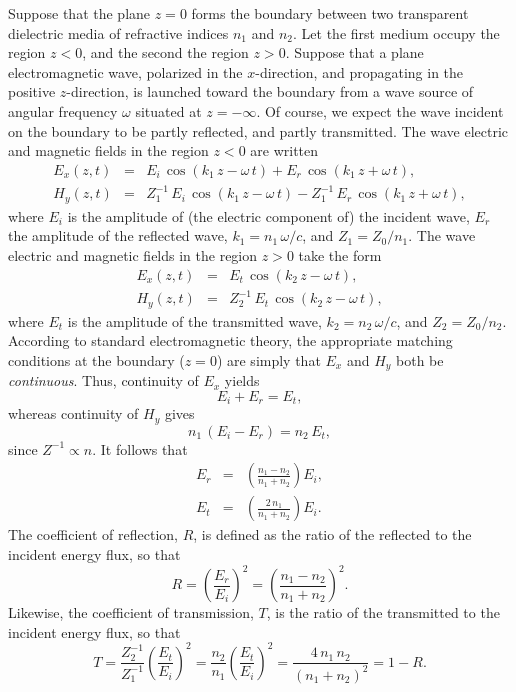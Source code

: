 Suppose that the plane $z=0$ forms the boundary between two transparent dielectric
media of refractive indices $n_1$ and $n_2$. Let the first medium occupy the
region $z<0$, and the second the region $z>0$. Suppose that a plane electromagnetic
wave, polarized in the $x$-direction, and propagating in the positive $z$-direction, is launched toward the boundary
from a wave source of angular frequency $\omega$ situated at $z=-\infty$. Of course, we expect the
wave incident on the boundary to be partly reflected, and partly transmitted. 
The wave electric and magnetic fields in the region $z<0$ are written
\begin{eqnarray}
E_x(z,t) &=& E_i\,\cos(k_1\,z-\omega\,t) + E_r\,\cos(k_1\,z+\omega\,t),\\[0.5ex]
H_y(z,t) &=&Z_1^{-1}\,E_i\,\cos(k_1\,z-\omega\,t)- Z_1^{-1}\,E_r\,\cos(k_1\,z+\omega\,t),
\end{eqnarray}
where $E_i$ is the amplitude of (the electric component of) the incident wave, $E_r$ the amplitude of the reflected wave, $k_1=n_1\,\omega/c$, and $Z_1=Z_0/n_1$. 
The wave electric and magnetic fields in the region $z>0$ take the form
\begin{eqnarray}
E_x(z,t) &=& E_t\,\cos(k_2\,z-\omega\,t),\\[0.5ex]
H_y(z,t) &=&Z_2^{-1}\,E_t\,\cos(k_2\,z-\omega\,t),
\end{eqnarray}
where $E_t$ is the amplitude of the transmitted wave, $k_2=n_2\,\omega/c$, and
$Z_2=Z_0/n_2$. 
According to standard electromagnetic theory, the appropriate matching conditions at the
boundary ($z=0$) are simply that $E_x$ and $H_y$ both be {\em continuous}. Thus,
continuity of $E_x$ yields
\begin{equation}
E_i + E_r = E_t,
\end{equation}
whereas continuity of $H_y$ gives
\begin{equation}
n_1\,(E_i-E_r) = n_2\,E_t,
\end{equation}
since $Z^{-1}\propto n$. 
It follows that
\begin{eqnarray}\label{e7.137}
E_r &=&\left(\frac{n_1-n_2}{n_1+n_2}\right)E_i,\\[0.5ex]
E_t &=&\left(\frac{2\,n_1}{n_1+n_2}\right)E_i.
\end{eqnarray}
The coefficient of reflection, $R$,  is defined as the ratio of the reflected to the incident energy
flux, so that
\begin{equation}
R = \left(\frac{E_r}{E_i}\right)^2 = \left(\frac{n_1-n_2}{n_1+n_2}\right)^2.
\end{equation}
Likewise, the coefficient of transmission, $T$, is the ratio of the
transmitted to the incident energy flux, so that
\begin{equation}
T = \frac{Z_2^{-1}}{Z_1^{-1}}\left(\frac{E_t}{E_i}\right)^2= \frac{n_2}{n_1}\left(\frac{E_t}{E_i}\right)^2 = \frac{4\,n_1\,n_2}{(n_1+n_2)^2} = 1-R.\label{e7.140}
\end{equation}

